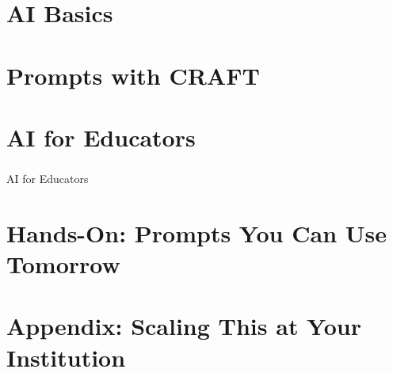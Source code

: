 
\section[Core]{AI Basics}



\section[Prompts]{Prompts with CRAFT}


\section[Educators]{AI for Educators}
\begin{frame}[fragile]\frametitle{}
\begin{center}
{\Large AI for Educators}
\end{center}
\end{frame}



\section[HandsOn]{Hands-On: Prompts You Can Use Tomorrow}


% 

% 






\section[Admin]{Appendix: Scaling This at Your Institution}

